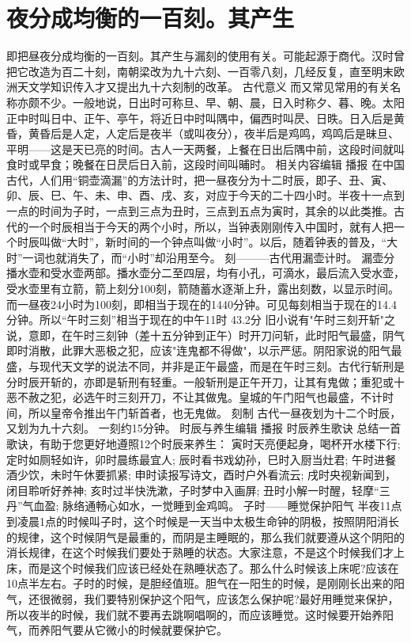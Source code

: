 \section{夜分成均衡的一百刻。其产生}
即把昼夜分成均衡的一百刻。其产生与漏刻的使用有关。可能起源于商代。汉时曾把它改造为百二十刻，南朝梁改为九十六刻、一百零八刻，几经反复，直至明末欧洲天文学知识传入才又提出九十六刻制的改革。
古代意义
而又常见常用的有关名称亦颇不少。一般地说，日出时可称旦、早、朝、晨，日入时称夕、暮、晚。太阳正中时叫日中、正午、亭午，将近日中时叫隅中，偏西时叫昃、日昳。日入后是黄昏，黄昏后是人定，人定后是夜半（或叫夜分），夜半后是鸡鸣，鸡鸣后是昧旦、平明——这是天已亮的时间。古人一天两餐，上餐在日出后隅中前，这段时间就叫食时或早食；晚餐在日昃后日入前，这段时间叫晡时。
相关内容编辑 播报
在中国古代，人们用“铜壶滴漏”的方法计时，把一昼夜分为十二时辰，即子、丑、寅、卯、辰、巳、午、未、申、酉、戌、亥，对应于今天的二十四小时。半夜十一点到一点的时间为子时，一点到三点为丑时，三点到五点为寅时，其余的以此类推。古代的一个时辰相当于今天的两个小时，所以，当钟表刚刚传入中国时，就有人把一个时辰叫做“大时”，新时间的一个钟点叫做“小时”。以后，随着钟表的普及，“大时”一词也就消失了，而“小时”却沿用至今。
刻———古代用漏壶计时。
漏壶分播水壶和受水壶两部。播水壶分二至四层，均有小孔，可滴水，最后流入受水壶，受水壶里有立箭，箭上刻分100刻，箭随蓄水逐渐上升，露出刻数，以显示时间。而一昼夜24小时为100刻，即相当于现在的1440分钟。可见每刻相当于现在的14.4分钟。所以“午时三刻”相当于现在的中午11时 43.2分
旧小说有"午时三刻开斩"之说，意即，在午时三刻钟（差十五分钟到正午）时开刀问斩，此时阳气最盛，阴气即时消散，此罪大恶极之犯，应该"连鬼都不得做"，以示严惩。阴阳家说的阳气最盛，与现代天文学的说法不同，并非是正午最盛，而是在午时三刻。古代行斩刑是分时辰开斩的，亦即是斩刑有轻重。一般斩刑是正午开刀，让其有鬼做；重犯或十恶不赦之犯，必选午时三刻开刀，不让其做鬼。皇城的午门阳气也最盛，不计时间，所以皇帝令推出午门斩首者，也无鬼做。
刻制
古代一昼夜划为十二个时辰，又划为九十六刻。
一刻约15分钟。
时辰与养生编辑 播报
时辰养生歌诀
总结一首歌诀，有助于您更好地遵照12个时辰来养生：
寅时天亮便起身，喝杯开水楼下行;
定时如厕轻如许，卯时晨练最宜人;
辰时看书戏幼孙，巳时入厨当灶君;
午时进餐酒少饮，未时午休要抓紧;
申时读报写诗文，酉时户外看流云;
戌时央视新闻到，闭目聆听好养神;
亥时过半快洗漱，子时梦中入画屏;
丑时小解一时醒，轻摩“三丹”气血盈;
脉络通畅心如水，一觉睡到金鸡鸣。
子时——睡觉保护阳气
半夜11点到凌晨1点的时候叫子时，这个时候是一天当中太极生命钟的阴极，按照阴阳消长的规律，这个时候阴气是最重的，而阴是主睡眠的，那么我们就要遵从这个阴阳的消长规律，在这个时候我们要处于熟睡的状态。大家注意，不是这个时候我们才上床，而是这个时候我们应该已经处在熟睡状态了。那么什么时候该上床呢?应该在10点半左右。子时的时候，是胆经值班。胆气在一阳生的时候，是刚刚长出来的阳气，还很微弱，我们要特别保护这个阳气，应该怎么保护呢?最好用睡觉来保护，所以夜半的时候，我们就不要再去跳啊唱啊的，而应该睡觉。这时候要开始养阳气，而养阳气要从它微小的时候就要保护它。

